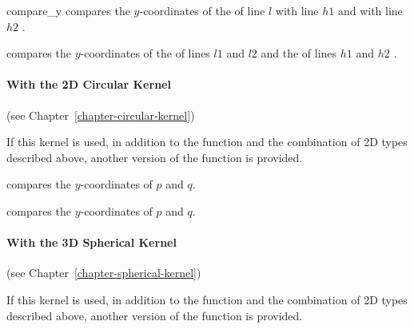 \begin{ccRefFunction}{compare_y}
        {compares the $y$-coordinates of the  of line $l$
         with line $h1$ and with line $h2$%
         .}


        {compares the $y$-coordinates of the  of lines $l1$
         and $l2$ and  the  of lines $h1$ and $h2$ 
         .}

\paragraph{With the 2D Circular Kernel} (see Chapter~\ref{chapter-circular-kernel}) 


If this kernel is used, in addition to the function and the
combination of 2D types described above, another version of the function
is provided.

{compares the $y$-coordinates of $p$ and $q$.}

{compares the $y$-coordinates of $p$ and $q$.}

\paragraph{With the 3D Spherical Kernel} (see Chapter~\ref{chapter-spherical-kernel}) 


If this kernel is used, in addition to the function and the
combination of 2D types described above, another version of the function
is provided.


\end{ccRefFunction}
